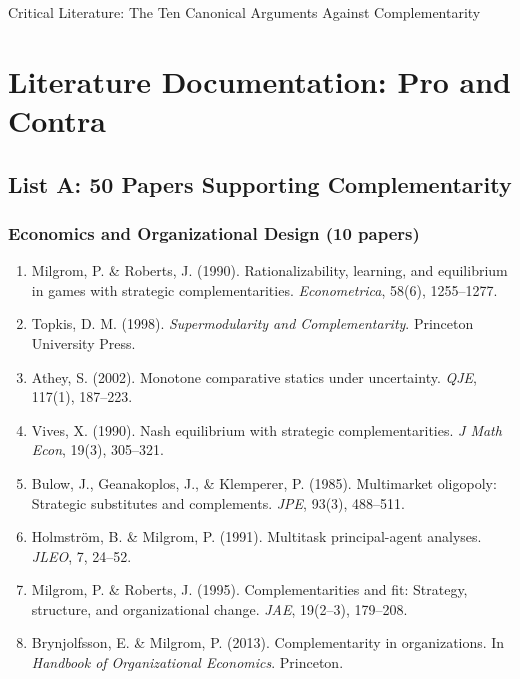 \begin{chapter}{Critical Literature: The Ten Canonical Arguments Against Complementarity}
\section{Literature Documentation: Pro and Contra}
\label{sec:literature}

\subsection{List A: 50 Papers Supporting Complementarity}

\subsubsection{Economics and Organizational Design (10 papers)}

\begin{enumerate}
    \item Milgrom, P. \& Roberts, J. (1990). Rationalizability, learning, and equilibrium in games with strategic complementarities. \textit{Econometrica}, 58(6), 1255--1277.

    \item Topkis, D. M. (1998). \textit{Supermodularity and Complementarity}. Princeton University Press.

    \item Athey, S. (2002). Monotone comparative statics under uncertainty. \textit{QJE}, 117(1), 187--223.

    \item Vives, X. (1990). Nash equilibrium with strategic complementarities. \textit{J Math Econ}, 19(3), 305--321.

    \item Bulow, J., Geanakoplos, J., \& Klemperer, P. (1985). Multimarket oligopoly: Strategic substitutes and complements. \textit{JPE}, 93(3), 488--511.

    \item Holmström, B. \& Milgrom, P. (1991). Multitask principal-agent analyses. \textit{JLEO}, 7, 24--52.

    \item Milgrom, P. \& Roberts, J. (1995). Complementarities and fit: Strategy, structure, and organizational change. \textit{JAE}, 19(2--3), 179--208.

    \item Brynjolfsson, E. \& Milgrom, P. (2013). Complementarity in organizations. In \textit{Handbook of Organizational Economics}. Princeton.


\end{enumerate}
\end{chapter}
